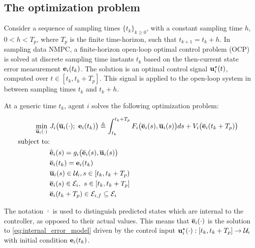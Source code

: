 \subsection{The optimization problem}
Consider a sequence of sampling times $\{t_k\}_{k \geq 0}$, with a constant
sampling time $h$, $0 < h < T_p$, where $T_p$ is the finite time-horizon, such
that $t_{k+1} = t_k + h$. In sampling data NMPC, a finite-horizon open-loop
optimal control problem (OCP) is solved at discrete sampling time instants $t_k$
based on the then-current state error measurement $\bm{\mathbf{e}}_i(t_k)$. The
solution is an optimal control signal $\bm{\mathbf{u}}_i^{\star}(t)$, computed over
$t \in [t_k, t_k+T_p]$. This signal is applied to the open-loop system in
between sampling times $t_k$ and $t_k + h$.

At a generic time $t_k$, agent $i$ solves the following optimization problem:

\begin{align}
  \min\limits_{\overline{\bm{\mathbf{u}}}_i (\cdot)}\ &
    J_i \big(\overline{\bm{\mathbf{u}}}_i (\cdot);\ \bm{\mathbf{e}}_i(t_k)\big) \triangleq
      \int_{t_k}^{t_k + T_p} F_i \big(\overline{\bm{\mathbf{e}}}_i(s), \overline{\bm{\mathbf{u}}}_i (s)\big) ds +
      V_i \big(\overline{\bm{\mathbf{e}}}_i (t_k + T_p)\big) \label{position_based_cost} \\
  \text{subject to:} & \nonumber \\
                     & \dot{\overline{\bm{\mathbf{e}}}}_i(s) = g_i \big(\overline{\bm{\mathbf{e}}}_i (s), \overline{\bm{\mathbf{u}}}_i (s)\big) \label{eq:internal_error_model} \\
  & \overline{\bm{\mathbf{e}}}_i (t_k) = \bm{\mathbf{e}}_i (t_k) \\
  & \overline{\bm{\mathbf{u}}}_i(s) \in \mathcal{U}_i, s \in [t_k, t_k + T_p)\\
  & \overline{\bm{\mathbf{e}}}_i (s) \in \mathcal{E}_i,\ s \in [t_k, t_k + T_p]\\
  & \overline{\bm{\mathbf{e}}}_i (t_k + T_p) \in \mathcal{E}_{i,f} \subseteq \mathcal{E}_i
\end{align}

The notation $\overline{\cdot}$ is used to distinguish predicted states which
are internal to the controller, as opposed to their actual values. This means
that $\overline{\bm{\mathbf{e}}}_i(\cdot)$ is the solution to
\eqref{eq:internal_error_model} driven by the control input
$\bm{\mathbf{u}}_i^{\star}(\cdot) : [t_k, t_k + T_p] \to \mathcal{U}_i$ with
initial condition $\bm{\mathbf{e}}_i(t_k)$.

